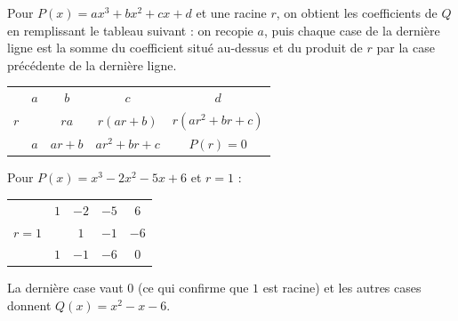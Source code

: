 \begin{methode}
	Pour $P(x) = ax^3 + bx^2 + cx + d$ et une racine $r$, on obtient les coefficients de $Q$ en remplissant le tableau suivant : on recopie $a$, puis chaque case de la dernière ligne est la somme du coefficient situé au-dessus et du produit de $r$ par la case précédente de la dernière ligne.

	\begin{center}
		\def\arraystretch{1.3}
		\begin{tabular}{c|cccc}
			              & $a$ & $b$      & $c$             & $d$            \\
			$r$           &     & $r a$    & $r(ar+b)$       & $r(ar^2+br+c)$ \\ \hline
			\phantom{$r$} & $a$ & $ar + b$ & $ar^2 + br + c$ & $P(r) = 0$
		\end{tabular}
	\end{center}

	Pour $P(x) = x^3 - 2x^2 - 5x + 6$ et $r = 1$ :
	\begin{center}
		\def\arraystretch{1.3}
		\begin{tabular}{c|cccc}
			        & $1$ & $-2$ & $-5$ & $6$  \\
			$r = 1$ &     & $1$  & $-1$ & $-6$ \\ \hline
			        & $1$ & $-1$ & $-6$ & $0$
		\end{tabular}
	\end{center}
	La dernière case vaut $0$ (ce qui confirme que $1$ est racine) et les autres cases donnent $Q(x) = x^2 - x - 6$.
\end{methode}

